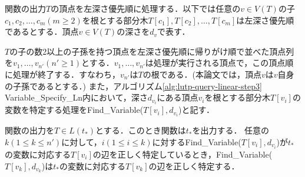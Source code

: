 関数の出力$T$の頂点を左深さ優先順に処理する．以下では任意の$ v\in V(T)$の子$c_1,c_2,\ldots,c_m(m\geq2)$を根とする部分木$T[c_1],T[c_2],\ldots,T[c_m]$は左深さ優先順であるとする．頂点$v\in V(T)$の深さを$d_v$で表す．\par
$T$の子の数2以上の子孫を持つ頂点を左深さ優先順に帰りがけ順で並べた頂点列を$v_1,\ldots,v_{n'}(n'\geq1)$とする．$v_1,\ldots,v_{n'}$は処理が実行される頂点で，この頂点順に処理が終了する．すなわち，$v_{n'}$は$T$の根である．(本論文では，頂点$v$は$v$自身の子孫であるとする．)
また，アルゴリズム\ref{alg:lutp-query-linear-step3} {\sc Variable\_Specify\_Ln}内において，深さ$d_{v_i}$にある頂点$v_i$を根とする部分木$T[v_i]$の変数を特定する処理をFind\_Variable($T[v_i],d_{v_i}$)と記す．


\begin{lemma}\label{lemma3.3}
  関数の出力を$T\in L(t_{\ast})$とする．このとき関数は$t_{\ast}$を出力する．
  任意の$k(1\leq k\leq n')$に対して，$i(1\leq i\leq k)$に対するFind\_Variable($T[v_i],d_{v_i}$)が$t_{\ast}$の変数に対応する$T[v_i]$の辺を正しく特定しているとき，Find\_Variable($T[v_k],d_{v_k}$)は$t_{\ast}$の変数に対応する$T[v_k]$の辺を正しく特定する．
\end{lemma}


